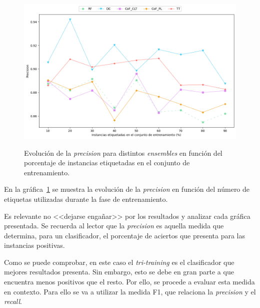 \begin{figure}[h]
	\caption[\textit{Phishing}: comparativa SL contra SSL (\textit{precision})]{Evolución de la \textit{precision} para distintos \textit{ensembles} en función del porcentaje de instancias etiquetadas en el conjunto de entrenamiento.}
	\centering
	\includegraphics[scale=0.45]{../img/memoria/5_phishing/f1f19_evolution_prec}
	\label{gr:ph-f1f19_sl-ssl-prec}
\end{figure}

En la gráfica~\ref{gr:ph-f1f19_sl-ssl-prec} se muestra la evolución de la \textit{precision} en función del número de etiquetas utilizadas durante la fase de entrenamiento.

Es relevante no <<dejarse engañar>> por los resultados y analizar cada gráfica presentada. Se recuerda al lector que la \textit{precision} es aquella medida que determina, para un clasificador, el porcentaje de aciertos que presenta para las instancias positivas.

Como se puede comprobar, en este caso el \textit{tri-training} es el clasificador que mejores resultados presenta. Sin embargo, esto se debe en gran parte a que encuentra menos positivos que el resto. Por ello, se procede a evaluar esta medida en contexto. Para ello se va a utilizar la medida F1, que relaciona la \textit{precision} y el \textit{recall}.

